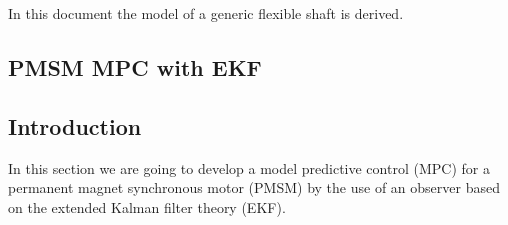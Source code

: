 \documentclass[11pt,a4paper]{scrartcl}
\title{\textbf{ 
		\begin{LARGE}
			Extended Kalman Filter:
		\end{LARGE} \\[24pt]
		\begin{Large}
	Application to PSM with Ttype MPC Three Phase Inverter.
	\end{Large}}
}
\author{\textbf{Davide Bagnara}}
\numberwithin{equation}{section}
\theoremstyle{it}
\theoremstyle{definition}
\begin{document}
	\thispagestyle{firstpage}
	\begin{mybox}
		\maketitle
		\vspace{125mm}
	\end{mybox}
	\newpage
	\tableofcontents
	\listoffigures	
	\listoftables
	\newpage
	
	{In this document the model of a generic flexible shaft is derived.}

\begin{onehalfspace}
\section{PMSM MPC with EKF}
\subsection{Introduction}
In this section we are going to develop a model predictive control (MPC) for a 
permanent magnet synchronous motor (PMSM) by the use of an observer based on 
the extended Kalman filter theory (EKF). 


\end{onehalfspace}
\end{document}
